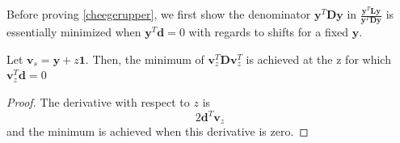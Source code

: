 \documentclass{article}
\begin{document}
Before proving \cref{cheegerupper},
we first show the denominator $\boldsymbol{y}^{T} \boldsymbol{D} \boldsymbol{y}$ in $\frac{\boldsymbol{y}^{T} \boldsymbol{L} \boldsymbol{y}}{\boldsymbol{y}^{T} \boldsymbol{D} \boldsymbol{y}}$ is essentially minimized when $\boldsymbol{y}^{T} \boldsymbol{d}=0$ with regards to shifts for a fixed $\boldsymbol{y}$.

\begin{lema}\label{mmmm}
Let $\boldsymbol{v}_{s}=\boldsymbol{y}+z \mathbf{1}$. Then, the minimum of $\boldsymbol{v}_{z}^{T} \boldsymbol{D} \boldsymbol{v}_{z}^{T}$ is achieved at the z for which $\boldsymbol{v}_{z}^{T} \boldsymbol{d}=0$
\end{lema}
\begin{proof}
The derivative with respect to $z$ is
$$
2 \boldsymbol{d}^{T} \boldsymbol{v}_{z}
$$
and the minimum is achieved when this derivative is zero.
\end{proof} 
\end{document}
